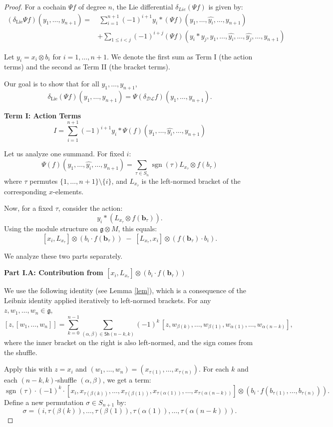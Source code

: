 \documentclass[10pt,a4paper]{amsart}
\newcommand{\DL}{\mathcal{DL}}
\begin{document}
\begin{proof}
For a cochain $\Psi f$ of degree $n$, the Lie differential \(\delta_{Lie}(\Psi f)\) is given by:
\[
\begin{aligned}
(\delta_{\mathrm{Lie}} \Psi f)(y_1, \dots, y_{n+1}) = &\ \sum_{i=1}^{n+1} (-1)^{i+1} y_i \ast (\Psi f)(y_1, \dots, \widehat{y_i}, \dots, y_{n+1}) \\
& +  \sum_{1\leq i < j} (-1)^{i+j} (\Psi f)(y_i\ast y_j, y_1, \ldots, \hat{y_i}, \ldots, \hat{y_j}, \ldots, y_{n+1})
\end{aligned}
\]


Let \(y_i = x_i \otimes b_i\) for \(i = 1, \dots, n+1\). We denote the first sum as Term I (the action terms) and the second as Term II (the bracket terms).

Our goal is to show that for all \(y_1, \dots, y_{n+1}\),
\[
\delta_{\mathrm{Lie}} (\Psi f)(y_1, \dots, y_{n+1}) = \Psi(\delta_{\DL} f)(y_1, \dots, y_{n+1}).
\]

\textbf{Term I: Action Terms}
\[
I = \sum_{i=1}^{n+1} (-1)^{i+1} y_i \ast \Psi(f)(y_1, \dots, \widehat{y_i}, \dots, y_{n+1})
\]

Let us analyze one summand. For fixed \(i\):
\[
\Psi(f)(y_1, \dots, \widehat{y_i}, \dots, y_{n+1}) = \sum_{\tau \in S_n} \operatorname{sgn}(\tau) L_{x_\tau} \otimes f(b_{\tau})
\]
where \(\tau\) permutes \(\{1, \dots, n+1\} \setminus \{i\}\), and \(L_{x_\tau}\) is the left-normed bracket of the corresponding \(x\)-elements.

Now, for a fixed \(\tau\), consider the action:
\[
y_i \ast (L_{x_\tau} \otimes f(\mathbf{b}_\tau)).
\]
Using the module structure on \(\mathfrak{g} \otimes M\), this equals:
\[
[x_i, L_{x_\tau}] \otimes (b_i \cdot f(\mathbf{b}_\tau)) \;-\; [L_{x_\tau}, x_i] \otimes (f(\mathbf{b}_\tau) \cdot b_i). \tag{1}
\]

We analyze these two parts separately.

\textbf{Part I.A: Contribution from \([x_i, L_{x_\tau}] \otimes (b_i \cdot f(\mathbf{b}_\tau))\)}

We use the following identity (see Lemma \ref{lem}), which is a consequence of the Leibniz identity applied iteratively to left-normed brackets. For any \(z, w_1, \dots, w_n \in \mathfrak{g}\),
\[
[z, [w_1, \dots, w_n]] = \sum_{k=0}^{n-1} \sum_{(\alpha, \beta) \in \mathsf{Sh}(n-k, k)} (-1)^k \, [z, w_{\beta(k)}, \dots, w_{\beta(1)}, w_{\alpha(1)}, \dots, w_{\alpha(n-k)}], \tag{2}
\]
where the inner bracket on the right is also left-normed, and the sign comes from the shuffle.

Apply this with \(z = x_i\) and \((w_1, \dots, w_n) = (x_{\tau(1)}, \dots, x_{\tau(n)})\). For each \(k\) and each \((n-k, k)\)-shuffle \((\alpha, \beta)\), we get a term:
\[
\operatorname{sgn}(\tau) \cdot (-1)^k \cdot [x_i, x_{\tau(\beta(k))}, \dots, x_{\tau(\beta(1))}, x_{\tau(\alpha(1))}, \dots, x_{\tau(\alpha(n-k))}] \otimes (b_i \cdot f(b_{\tau(1)}, \dots, b_{\tau(n)})).
\]
Define a new permutation \(\sigma \in S_{n+1}\) by:
\[
\sigma = (i, \tau(\beta(k)), \dots, \tau(\beta(1)), \tau(\alpha(1)), \dots, \tau(\alpha(n-k))).
\]



\end{proof}
\end{document}
